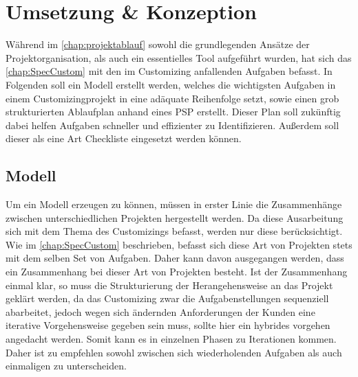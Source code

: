 \chapter{Umsetzung \& Konzeption}
\label{chap:umsetzung}

	Während im \autoref{chap:projektablauf} sowohl die grundlegenden Ansätze der Projektorganisation, als auch ein essentielles Tool aufgeführt wurden, hat sich das \autoref{chap:SpecCustom} mit den im Customizing anfallenden Aufgaben befasst. In Folgenden soll ein Modell erstellt werden, welches die wichtigsten Aufgaben in einem Customizingprojekt in eine adäquate Reihenfolge setzt, sowie einen grob strukturierten Ablaufplan anhand eines \acs{PSP} erstellt. Dieser Plan soll zukünftig dabei helfen Aufgaben schneller und effizienter zu Identifizieren. Außerdem soll dieser als eine Art Checkliste eingesetzt werden können. 
	
\section*{Modell}

	Um ein Modell erzeugen zu können, müssen in erster Linie die Zusammenhänge zwischen unterschiedlichen Projekten hergestellt werden. Da diese Ausarbeitung sich mit dem Thema des Customizings befasst, werden nur diese berücksichtigt. Wie im \autoref{chap:SpecCustom} beschrieben, befasst sich diese Art von Projekten stets mit dem selben Set von Aufgaben. Daher kann davon ausgegangen werden, dass ein Zusammenhang bei dieser Art von Projekten besteht.
	Ist der Zusammenhang einmal klar, so muss die Strukturierung der Herangehensweise an das Projekt geklärt werden, da das Customizing zwar die Aufgabenstellungen sequenziell abarbeitet, jedoch wegen sich ändernden Anforderungen der Kunden eine iterative Vorgehensweise gegeben sein muss, sollte hier ein hybrides vorgehen angedacht werden. Somit kann es in einzelnen Phasen zu Iterationen kommen. Daher ist zu empfehlen sowohl zwischen sich wiederholenden Aufgaben als auch einmaligen zu unterscheiden. 
	
